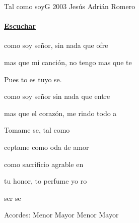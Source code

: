 \documentclass[12pt, spanish]{book}
\begin{document}
    \begin{song}{Tal como soy}{G}
        {2003} %
        {Jesús Adrián Romero}
        {} %
        {}
        \ifChordBk
        \paragraph{\mbox{}\hfill\protect\href{https://open.spotify.com/intl-es/track/6pkcy9PJt40IsyNpd7NV0s}{Escuchar}\mbox{}\hfill}
        \fi


        \begin{SBOpGroup}
             como soy señor, sin nada que ofre

            mas que mi canción, no tengo mas que te

            Pues to es tuyo se.
        \end{SBOpGroup}

        \begin{SBOpGroup}
             como soy señor sin nada que entre

            mas que el corazón, me rindo todo a 

            Tomame se, tal como 
        \end{SBOpGroup}

        \begin{SBChorus}
            ceptame como oda de amor

            como  sacrificio agrable en

            tu honor, to perfume yo ro

            ser se
        \end{SBChorus}

        \ifChordBk
        \begin{SBOpGroup}
            Acordes:
             \hfill
             Menor \hfill\null\break
             Mayor \hfill
             Menor \hfill
             Mayor \hfill\null\break
        \end{SBOpGroup}
        \fi
    \end{song}
\end{document}

